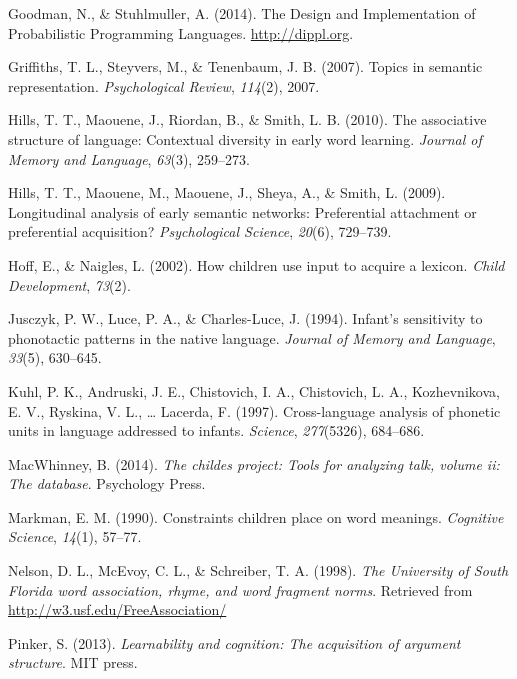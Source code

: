 \documentclass[english,floatsintext,man]{apa6}
\theoremstyle{definition}
\theoremstyle{definition}
\theoremstyle{definition}
\theoremstyle{remark}
\begin{document}
\hypertarget{ref-dippl}{}
Goodman, N., \& Stuhlmuller, A. (2014). The Design and Implementation of
Probabilistic Programming Languages. \url{http://dippl.org}.

\hypertarget{ref-griffiths07}{}
Griffiths, T. L., Steyvers, M., \& Tenenbaum, J. B. (2007). Topics in
semantic representation. \emph{Psychological Review}, \emph{114}(2),
2007.

\hypertarget{ref-hills2010}{}
Hills, T. T., Maouene, J., Riordan, B., \& Smith, L. B. (2010). The
associative structure of language: Contextual diversity in early word
learning. \emph{Journal of Memory and Language}, \emph{63}(3), 259--273.

\hypertarget{ref-hills2009}{}
Hills, T. T., Maouene, M., Maouene, J., Sheya, A., \& Smith, L. (2009).
Longitudinal analysis of early semantic networks: Preferential
attachment or preferential acquisition? \emph{Psychological Science},
\emph{20}(6), 729--739.

\hypertarget{ref-hoff2002}{}
Hoff, E., \& Naigles, L. (2002). How children use input to acquire a
lexicon. \emph{Child Development}, \emph{73}(2).

\hypertarget{ref-jusczyk1994}{}
Jusczyk, P. W., Luce, P. A., \& Charles-Luce, J. (1994). Infant's
sensitivity to phonotactic patterns in the native language.
\emph{Journal of Memory and Language}, \emph{33}(5), 630--645.

\hypertarget{ref-kuhl1997}{}
Kuhl, P. K., Andruski, J. E., Chistovich, I. A., Chistovich, L. A.,
Kozhevnikova, E. V., Ryskina, V. L., \ldots{} Lacerda, F. (1997).
Cross-language analysis of phonetic units in language addressed to
infants. \emph{Science}, \emph{277}(5326), 684--686.

\hypertarget{ref-macwhinney2014}{}
MacWhinney, B. (2014). \emph{The childes project: Tools for analyzing
talk, volume ii: The database}. Psychology Press.

\hypertarget{ref-markman90}{}
Markman, E. M. (1990). Constraints children place on word meanings.
\emph{Cognitive Science}, \emph{14}(1), 57--77.

\hypertarget{ref-nelson1998}{}
Nelson, D. L., McEvoy, C. L., \& Schreiber, T. A. (1998). \emph{The
University of South Florida word association, rhyme, and word fragment
norms}. Retrieved from \url{http://w3.usf.edu/FreeAssociation/}

\hypertarget{ref-pinker2013}{}
Pinker, S. (2013). \emph{Learnability and cognition: The acquisition of
argument structure}. MIT press.
\end{document}
